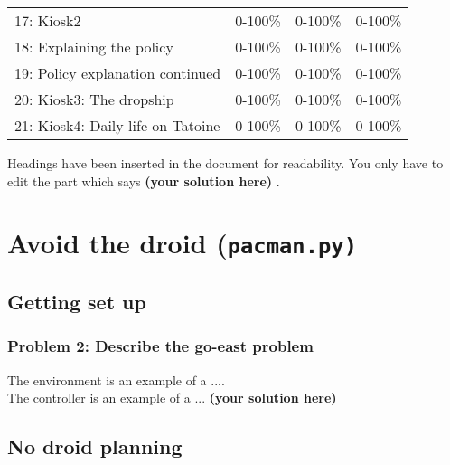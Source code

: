 \documentclass[12pt,twoside]{article}
\newcommand\redt[1]{ {\textcolor[rgb]{0.60, 0.00, 0.00}{\textbf{ #1} } } }
\newcommand{\yoursolution}{ \redt{(your solution here) } }
\begin{document}
\begin{table}[ht!]
\begin{tabular}{llll}
 17: Kiosk2                                             & 0-100\%  & 0-100\% & 0-100\%  \\
 18: Explaining the policy                              & 0-100\%  & 0-100\% & 0-100\%  \\
 19: Policy explanation continued                       & 0-100\%  & 0-100\% & 0-100\%  \\
 20: Kiosk3: The dropship                               & 0-100\%  & 0-100\% & 0-100\%  \\
 21: Kiosk4: Daily life on Tatoine                      & 0-100\%  & 0-100\% & 0-100\%  \\
\bottomrule
\end{tabular}
\end{table}


Headings have been inserted in the document for readability. You only have to edit the part which says \yoursolution. 

\section{Avoid the droid (\texttt{pacman.py)}} 
\subsection{Getting set up}
\subsubsection*{{\color{red}Problem 2:  Describe the go-east problem}}
	
		The environment is an example of a .... \\		
		The controller is an example of a ...
		\yoursolution 	
	
\subsection{No droid planning}
\end{document}
